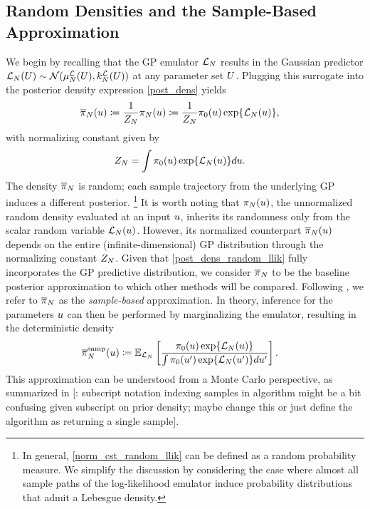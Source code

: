 \documentclass[12pt]{article}
\begin{document}
\subsection{Random Densities and the Sample-Based Approximation}
We begin by recalling that the GP emulator $\llikEm$ results in the Gaussian predictor 
 $\llikEm[\Ndesign](\parMat) \sim \Gaussian(\emMean[\Ndesign]{\llik}(\parMat), \emKer[\Ndesign]{\llik}(\parMat))$
 at any parameter set $\parMat$. Plugging this surrogate into the posterior density expression \ref{post_dens} yields
\begin{align}
\llikEmRdm[\Ndesign]{\postDensNorm}(\Par) 
&\Def \frac{1}{\llikEmRdm[\Ndesign]{\normCst}} \llikEmRdmDens[\Ndesign](\Par) 
\Def \frac{1}{\llikEmRdm[\Ndesign]{\normCst}} \priorDens(\Par) \Exp{\llikEm[\Ndesign](\Par)} \label{post_dens_random_llik},
\end{align}
with normalizing constant given by 
\begin{align}
\llikEmRdm[\Ndesign]{\normCst}
&= \int \priorDens(\Par) \Exp{\llikEm[\Ndesign](\Par)} d\Par \label{norm_cst_random_llik}. 
\end{align}
The density $\llikEmRdm[\Ndesign]{\postDensNorm}$ is random; each sample trajectory from the 
underlying GP induces a different posterior.
\footnote{In general, \ref{norm_cst_random_llik} can be defined as a random probability measure. We simplify the 
discussion by considering the case where almost all sample paths of the log-likelihood emulator induce probability 
distributions that admit a Lebesgue density.}
It is worth noting that $\llikEmRdmDens[\Ndesign](\Par)$,
the unnormalized random density evaluated at an input $\Par$, inherits its randomness only from the scalar random 
variable $\llikEm(\Par)$. However, its normalized counterpart $\llikEmRdm[\Ndesign]{\postDensNorm}(\Par)$ depends 
on the entire (infinite-dimensional) GP distribution through the normalizing constant $\llikEmRdm[\Ndesign]{\normCst}$.
Given that \ref{post_dens_random_llik} fully incorporates the GP predictive distribution, we consider 
$\llikEmRdm[\Ndesign]{\postDensNorm}$ to be the baseline posterior approximation to which other methods will
be compared. Following \citet{StuartTeck1}, we refer to $\llikEmRdm[\Ndesign]{\postDensNorm}$ as the 
\textit{sample-based} approximation. In theory, inference for the parameters $\Par$ can then be performed 
by marginalizing the emulator, resulting in the deterministic density
\begin{align}
\llikEmSampDensNorm[\Ndesign](\Par)
&\Def \E_{\llikEm}\left[\frac{\priorDens(\Par) \Exp{\llikEm[\Ndesign](\Par)}}{\int \priorDens(\Par^\prime) \Exp{\llikEm[\Ndesign](\Par^\prime)} d\Par^\prime} \right].
\label{samp_dens_norm}
\end{align}
This approximation can be understood from a Monte Carlo perspective, 
as summarized in  [\todo: subscript notation indexing samples in algorithm might 
be a bit confusing given subscript on prior density; maybe change this or just define the algorithm as returning 
a single sample]. 
\end{document}
